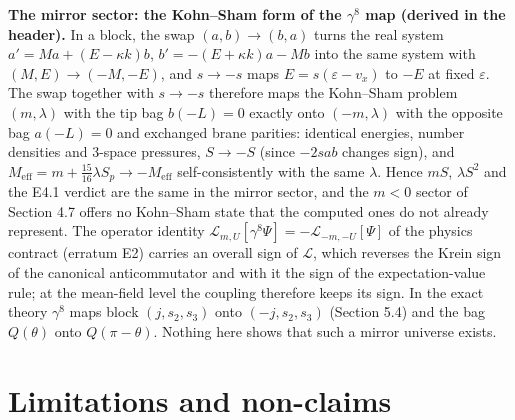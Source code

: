 \documentclass[11pt]{article}
\begin{document}
\textbf{The mirror sector: the Kohn--Sham form of the $\gamma^8$ map (derived in the \texttt{} header).} In a block, the swap $(a,b)\to(b,a)$ turns the real system $a'=Ma+(E-\kappa k)b$, $b'=-(E+\kappa k)a-Mb$ into the same system with $(M,E)\to(-M,-E)$, and $s\to-s$ maps $E=s(\varepsilon-v_x)$ to $-E$ at fixed $\varepsilon$. The swap together with $s\to-s$ therefore maps the Kohn--Sham problem $(m,\lambda)$ with the tip bag $b(-L)=0$ exactly onto $(-m,\lambda)$ with the opposite bag $a(-L)=0$ and exchanged brane parities: identical energies, number densities and 3-space pressures, $S\to-S$ (since $-2sab$ changes sign), and $M_{\mathrm{eff}}=m+\tfrac{15}{16}\lambda S_p\to-M_{\mathrm{eff}}$ self-consistently with the same $\lambda$. Hence $mS$, $\lambda S^2$ and the E4.1 verdict are the same in the mirror sector, and the $m<0$ sector of Section 4.7 offers no Kohn--Sham state that the computed ones do not already represent. The operator identity $\mathcal L_{m,U}[\gamma^8\Psi]=-\mathcal L_{-m,-U}[\Psi]$ of the physics contract (erratum E2) carries an overall sign of $\mathcal L$, which reverses the Krein sign of the canonical anticommutator and with it the sign of the expectation-value rule; at the mean-field level the coupling therefore keeps its sign. In the exact theory $\gamma^8$ maps block $(j,s_2,s_3)$ onto $(-j,s_2,s_3)$ (Section 5.4) and the bag $Q(\theta)$ onto $Q(\pi-\theta)$. Nothing here shows that such a mirror universe exists.

\section{Limitations and non-claims}
\end{document}
